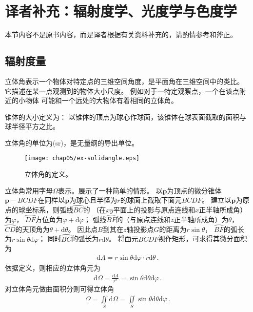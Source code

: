 \section{译者补充：辐射度学、光度学与色度学}\label{sec:译者补充：辐射度学、光度学与色度学}

\begin{remark}
      本节内容不是原书内容，而是译者根据有关资料\citep{978-7-5640-0658-7,
            wiki:solidangle,GB3102.6-93,enwiki:1052681830,
            wiki:candela,Hoffmann2015,wiki:eye}补充的，请酌情参考和斧正。
\end{remark}

\subsection{辐射度量}\label{sub:辐射度量}
立体角表示一个物体对特定点的三维空间角度，是平面角在三维空间中的类比。
它描述在某一点观测到的物体大小尺度。
例如对于一特定观察点，一个在该点附近的小物体
可能和一个远处的大物体有着相同的立体角。
\begin{definition}
      锥体的大小定义为：
      以锥体的顶点为球心作球面，该锥体在球表面截取的面积与球半径平方之比。
\end{definition}
立体角的单位为(sr)，是无量纲的导出单位。

\begin{figure}[htbp]
      \centering\texttt{[image: chap05/ex-solidangle.eps]}
      \caption{立体角的定义。}
      \label{fig:5.ex01}
\end{figure}

立体角常用字母$\varOmega$表示。展示了一种简单的情形。
以$\bm p$为顶点的微分锥体${\bm p}-BCDF$在同样以$\bm p$为球心且半径为$r$的球面上截取下面元$BCDF$。
建立以$\bm p$为原点的球坐标系，则弧线$\wideparen{BC}$的
（在$xy$平面上的投影与原点连线和$x$正半轴所成角）为$\varphi$，
$\wideparen{DF}$方位角为$\varphi+\mathrm{d}\varphi$；
弧线$\wideparen{BF}$的（与原点连线和$z$正半轴所成角）为$\theta$，
$\wideparen{CD}$的天顶角为$\theta+\mathrm{d}\theta$。
因此点$B$到其在$z$轴投影点$G$的距离为$r\sin\theta$，
$\wideparen{BF}$的弧长为$r\sin\theta\mathrm{d}\varphi$；
同时$\wideparen{BC}$的弧长为$r\mathrm{d}\theta$。
将面元$BCDF$视作矩形，可求得其微分面积为
\begin{align}
      \mathrm{d}A=r\sin\theta\mathrm{d}\varphi\cdot r\mathrm{d}\theta\, .
\end{align}
依据定义，则相应的立体角元为
\begin{align}
      \mathrm{d}\varOmega=\frac{\mathrm{d}A}{r^2}=\sin\theta\mathrm{d}\theta\mathrm{d}\varphi\, .
\end{align}
对立体角元做曲面积分则可得立体角
\begin{align}
      \varOmega=\iint\limits_S \mathrm{d}\varOmega=\iint\limits_S \sin\theta\mathrm{d}\theta\mathrm{d}\varphi\, .
\end{align}

